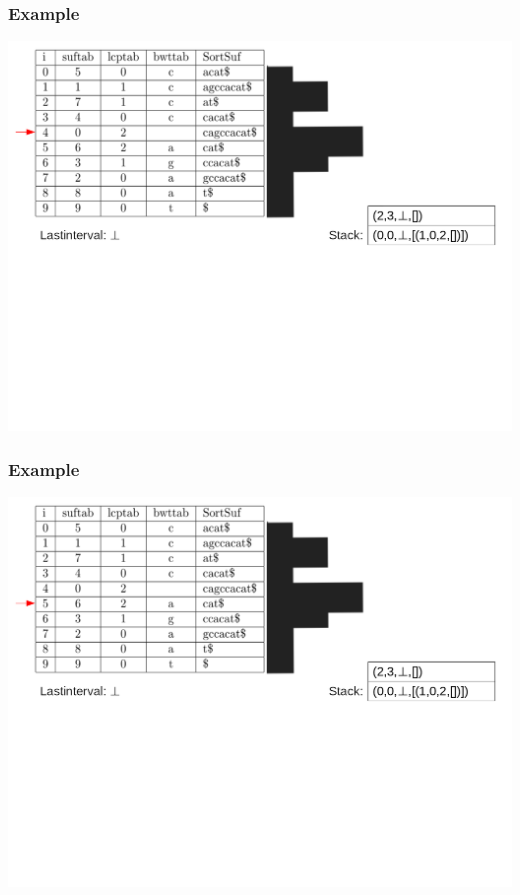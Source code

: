\documentclass[compress,handout]{beamer} %
\begin{document}
\begin{frame}
	\frametitle{Example}
	\includegraphics[width=\textwidth, height=\textheight, keepaspectratio=true]{traversal_7}
\end{frame}

\begin{frame}
	\frametitle{Example}
	\includegraphics[width=\textwidth, height=\textheight, keepaspectratio=true]{traversal_8}
\end{frame}
\end{document}
